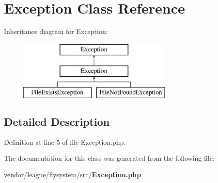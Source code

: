 \section{Exception Class Reference}
\label{class_league_1_1_flysystem_1_1_exception}
Inheritance diagram for Exception\+:\begin{figure}[H]
\begin{center}
\leavevmode
\includegraphics[height=3.000000cm]{class_league_1_1_flysystem_1_1_exception}
\end{center}
\end{figure}


\subsection{Detailed Description}


Definition at line 5 of file Exception.\+php.



The documentation for this class was generated from the following file\+:\begin{DoxyCompactItemize}
\item 
vendor/league/flysystem/src/{\bf Exception.\+php}\end{DoxyCompactItemize}
